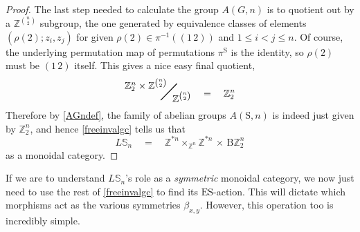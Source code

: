 \documentclass{amsbook} %
\newcommand{\bigquotient}[2]{ \raisebox{0.75\height}{$#1$} \mkern-12mu\scalebox{2}{$\diagup$}\mkern-10mu \raisebox{-0.5\height}{$#2$} }
\numberwithin{section}{chapter}
\begin{document}
\begin{proof}
The last step needed to calculate the group $A(G,n)$ is to quotient out by a $\mathbb{Z}^{{n}\choose{2}}$ subgroup, the one generated by equivalence classes of elements $(\rho(2) ; z_i, z_j )$ for given $\rho(2) \in \pi^{-1}((1 \, 2))$ and $1 \le i < j \le n$. Of course, the underlying permutation map of permutations $\pi^{\mathrm{S}}$ is the identity, so $\rho(2)$ must be $(1 \, 2)$ itself. This gives a nice easy final quotient,
\[ \bigquotient{\mathbb{Z}_2^{n} \times \mathbb{Z}^{{n}\choose{2}}}{\mathbb{Z}^{{n}\choose{2}}} \quad = \quad \mathbb{Z}_2^{n}\]
Therefore by \cref{AGndef}, the family of abelian groups $A(\mathrm{S},n)$ is indeed just given by $\mathbb{Z}_2^{n}$, and hence \cref{freeinvalgc} tells us that
\[ L\mathbb{S}_n \quad = \quad \mathbb{Z}^{\ast n} \times_{\mathbb{Z}^n} \mathbb{Z}^{\ast n}  \, \times \, \mathrm{B}\mathbb{Z}_2^{n} \]
as a monoidal category.
\end{proof} 

If we are to understand $L\mathbb{S}_n$'s role as a \emph{symmetric} monoidal category, we now just need to use the rest of \cref{freeinvalgc} to find its $\mathrm{ES}$-action. This will dictate which morphisms act as the various symmetries $\beta_{x, y}$. However, this operation too is incredibly simple.
\end{document}
